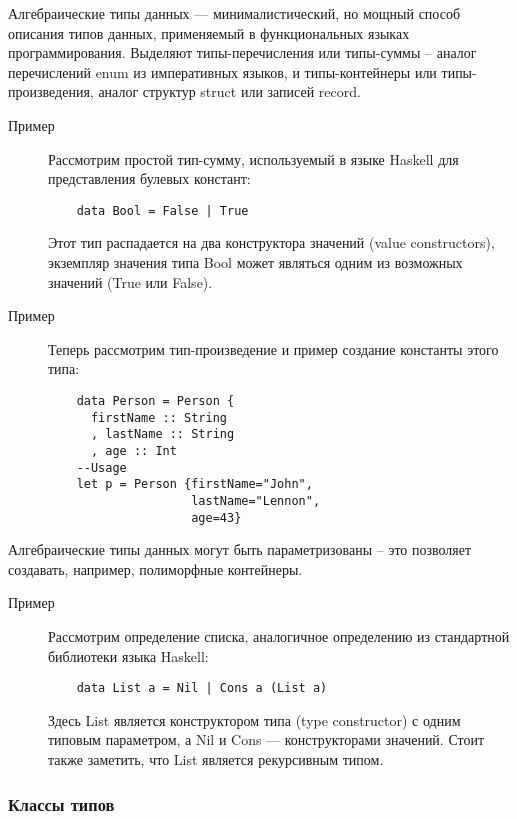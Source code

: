Алгебраические типы данных --- минималистический, но мощный способ описания типов данных, применяемый в функциональных языках программирования. Выделяют типы-перечисления или типы-суммы -- аналог перечислений enum из императивных языков, и типы-контейнеры или типы-произведения, аналог структур struct или записей record.

\begin{description}
  \item[Пример] 
  Рассмотрим простой тип-сумму, используемый в языке Haskell для представления булевых констант: 
  \begin{lstlisting}
    data Bool = False | True  

  \end{lstlisting}
  Этот тип распадается на два конструктора значений (value constructors), экземпляр значения типа Bool может являться одним из возможных значений (True или False).
\end{description}

\begin{description}
  \item[Пример] 
  Теперь рассмотрим тип-произведение и пример создание константы этого типа: 
  \begin{lstlisting}
    data Person = Person {
      firstName :: String
      , lastName :: String
      , age :: Int
    --Usage
    let p = Person {firstName="John", 
                    lastName="Lennon", 
                    age=43}
  \end{lstlisting}
\end{description}

Алгебраические типы данных могут быть параметризованы -- это позволяет создавать, например, полиморфные контейнеры.

\begin{description}
  \item[Пример] 
  Рассмотрим определение списка, аналогичное определению из стандартной библиотеки языка Haskell:
  \begin{lstlisting}
    data List a = Nil | Cons a (List a)
  \end{lstlisting}
  Здесь List является конструктором типа (type constructor) с одним типовым параметром, а Nil и Cons --- конструкторами значений. Стоит также заметить, что List является рекурсивным типом.
\end{description}

\subsubsection{Классы типов}


